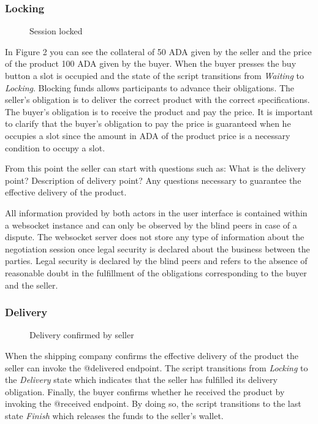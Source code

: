 \documentclass[12pt]{article}
\begin{document}
\subsubsection { Locking }

\begin{figure}[ht]
  \centering
  
  \caption{Session locked}
  \label{fig:locking}
\end{figure}


In Figure 2 you can see the collateral of 50 ADA given by the seller and the price of the product 100 ADA given by the buyer.
When the buyer presses the buy button a slot is occupied and the state of the script transitions from \emph{Waiting} to \emph{Locking}.
Blocking funds allows participants to advance their obligations.
The seller's obligation is to deliver the correct product with the correct specifications. The buyer's obligation is to receive the product and pay the price.
It is important to clarify that the buyer's obligation to pay the price is guaranteed when he occupies a slot since the amount in ADA of the product price is a necessary condition to occupy a slot.

From this point the seller can start with questions such as: What is the delivery point? Description of delivery point? Any questions necessary to guarantee the effective delivery of the product.

All information provided by both actors in the user interface is contained within a websocket instance and can only be observed by the blind peers in case of a dispute.
The websocket server does not store any type of information about the negotiation session once legal security is declared about the business between the parties.
Legal security is declared by the blind peers and refers to the absence of reasonable doubt in the fulfillment of the obligations corresponding to the buyer and the seller.


\subsubsection { Delivery }


\begin{figure}[ht]
  \centering
  
  \caption{Delivery confirmed by seller}  
  \label{fig:delivered}
\end{figure}



When the shipping company confirms the effective delivery of the product the seller can invoke the @delivered endpoint.
The script transitions from \emph{Locking} to the \emph{Delivery} state which indicates that the seller has fulfilled its delivery obligation.
Finally, the buyer confirms whether he received the product by invoking the @received endpoint. By doing so, the script transitions to the last state \emph{Finish} which releases the funds to the seller's wallet.
\end{document}
